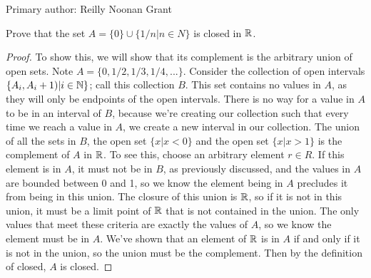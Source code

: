 Primary author: Reilly Noonan Grant

\begin{minorEx} %
Prove that the set $A = \{0\} \cup \{1/n | n \in N\}$ is closed in $\mathbb{R}$.
\end{minorEx}

\begin{proof}
To show this, we will show that its complement is the arbitrary union
of open sets. Note $A=\{0, 1/2, 1/3, 1/4, ...\}$. Consider the
collection of open intervals $\{A_i, A_i+1) | i \in \mathbb{N} \}$; call this
collection $B$. This set contains no values in $A$, as they will only
be endpoints of the open intervals. There is no way for a value in $A$
to be in an interval of $B$, because we're creating our collection
such that every time we reach a value in $A$, we create a new interval
in our collection. The union of all the sets in $B$, the open set $\{x
| x < 0\}$ and the open set $\{x | x > 1\}$ is the complement of $A$ in
$\mathbb{R}$. To see this, choose an arbitrary element $r \in R$. If this element is in $A$, it must not be in $B$, as previously discussed, and the values in $A$ are bounded between 0 and 1, so we know the element being in $A$ precludes it from being in this union. The closure of this union is $\mathbb{R}$, so if it is not in this union, it must be a limit point of $\mathbb{R}$ that is not contained in the union. The only values that meet these criteria are exactly the values of $A$, so we know the element must be in $A$. We've shown that an element of $\mathbb{R}$ is in $A$ if and only if it is not in the union, so the union must be the complement. Then by the definition of closed, $A$ is closed.
\end{proof}
